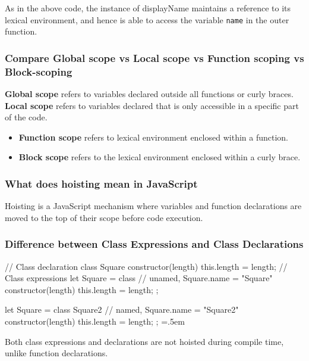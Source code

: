 \documentclass[12pt, a4paper]{article}
\newcommand{\code}[1]{\texttt{#1}}
\newenvironment{lcverbatim}
 {\SaveVerbatim{cverb}}
 {\endSaveVerbatim
  \flushleft\fboxrule=0pt\fboxsep=.5em
  \colorbox{test}{%
    \makebox[\dimexpr\linewidth-2\fboxsep][l]{\BUseVerbatim{cverb}}%
  }
  \endflushleft
}
\begin{document}
As in the above code, the instance of displayName maintains a reference to its lexical environment, and hence is able to access the variable \code{name} in the outer function.

\subsubsection*{Compare Global scope vs Local scope vs Function scoping vs Block-scoping}
\textbf{Global scope} refers to variables declared outside all functions or curly braces.\newline
\textbf{Local scope} refers to variables declared that is only accessible in a specific part of the code.
\begin{itemize}
    \item \textbf{Function scope} refers to lexical environment enclosed within a function.
    \item \textbf{Block scope} refers to the lexical environment enclosed within a curly brace.
\end{itemize}

\subsubsection*{What does hoisting mean in JavaScript}
Hoisting is a JavaScript mechanism where variables and function declarations are moved to the top of their scope before code execution.

\subsubsection*{Difference between Class Expressions and Class Declarations}
\begin{lcverbatim}
// Class declaration
class Square {
    constructor(length) {
        this.length = length;
    }
}
// Class expressions
let Square = class {          // unamed, Square.name = "Square"
  constructor(length) {
    this.length = length;
  }
};

let Square = class Square2 {  // named, Square.name = "Square2"
  constructor(length) {
    this.length = length;
  }
};
\end{lcverbatim}

Both class expressions and declarations are not hoisted during compile time, unlike function declarations.
\end{document}
